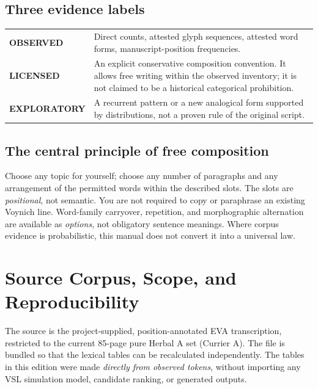 \documentclass[11pt,a4paper]{article}
\newcommand{\STATUS}[1]{\textsf{\bfseries #1}}
\begin{document}
\subsection{Three evidence labels}
\begin{tabularx}{\textwidth}{@{}p{27mm}Y@{}}\toprule
\STATUS{OBSERVED} & Direct counts, attested glyph sequences, attested word forms, manuscript-position frequencies. \\
\STATUS{LICENSED} & An explicit conservative composition convention. It allows free writing within the observed inventory; it is not claimed to be a historical categorical prohibition. \\
\STATUS{EXPLORATORY} & A recurrent pattern or a new analogical form supported by distributions, not a proven rule of the original script. \\
\bottomrule\end{tabularx}

\subsection{The central principle of free composition}
Choose any topic for yourself; choose any number of paragraphs and any arrangement of the permitted words within the described slots. The slots are \emph{positional}, not semantic. You are not required to copy or paraphrase an existing Voynich line. Word-family carryover, repetition, and morphographic alternation are available as \emph{options}, not obligatory sentence meanings. Where corpus evidence is probabilistic, this manual does not convert it into a universal law.

\section{Source Corpus, Scope, and Reproducibility}
The source is the project-supplied, position-annotated EVA transcription, restricted to the current 85-page pure Herbal A set (Currier A). The file is bundled so that the lexical tables can be recalculated independently. The tables in this edition were made \emph{directly from observed tokens}, without importing any VSL simulation model, candidate ranking, or generated outputs.
\end{document}
